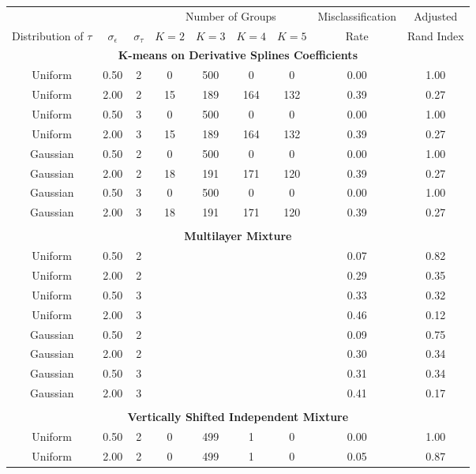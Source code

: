 \begin{table}[ht]
\begin{center}
\begin{tabular}{ccc|cccccc}
  \hline &&&\multicolumn{4}{c}{Number of Groups}&Misclassification&Adjusted\\ Distribution of $\tau$&$\sigma_{\epsilon}$&$\sigma_{\tau}$&$K=2$&$K=3$&$K=4$&$K=5$&Rate&Rand Index\\ \hline\multicolumn{9}{c}{\textbf{K-means on Derivative Splines Coefficients}}\\ Uniform & 0.50 &   2 & 0 & 500 & 0 & 0 & 0.00 & 1.00 \\ 
  Uniform & 2.00 &   2 & 15 & 189 & 164 & 132 & 0.39 & 0.27 \\ 
  Uniform & 0.50 &   3 & 0 & 500 & 0 & 0 & 0.00 & 1.00 \\ 
  Uniform & 2.00 &   3 & 15 & 189 & 164 & 132 & 0.39 & 0.27 \\ 
  Gaussian & 0.50 &   2 & 0 & 500 & 0 & 0 & 0.00 & 1.00 \\ 
  Gaussian & 2.00 &   2 & 18 & 191 & 171 & 120 & 0.39 & 0.27 \\ 
  Gaussian & 0.50 &   3 & 0 & 500 & 0 & 0 & 0.00 & 1.00 \\ 
  Gaussian & 2.00 &   3 & 18 & 191 & 171 & 120 & 0.39 & 0.27 \\ 
   \\ \multicolumn{9}{c}{\textbf{Multilayer Mixture}}\\Uniform & 0.50 &   2 &  &  &  &  & 0.07 & 0.82 \\ 
  Uniform & 2.00 &   2 &  &  &  &  & 0.29 & 0.35 \\ 
  Uniform & 0.50 &   3 &  &  &  &  & 0.33 & 0.32 \\ 
  Uniform & 2.00 &   3 &  &  &  &  & 0.46 & 0.12 \\ 
  Gaussian & 0.50 &   2 &  &  &  &  & 0.09 & 0.75 \\ 
  Gaussian & 2.00 &   2 &  &  &  &  & 0.30 & 0.34 \\ 
  Gaussian & 0.50 &   3 &  &  &  &  & 0.31 & 0.34 \\ 
  Gaussian & 2.00 &   3 &  &  &  &  & 0.41 & 0.17 \\ 
   \\ \multicolumn{9}{c}{\textbf{Vertically Shifted Independent Mixture}}\\Uniform & 0.50 &   2 & 0 & 499 & 1 & 0 & 0.00 & 1.00 \\ 
  Uniform & 2.00 &   2 & 0 & 499 & 1 & 0 & 0.05 & 0.87 \\ 

\end{tabular}
\end{center}
\end{table}
